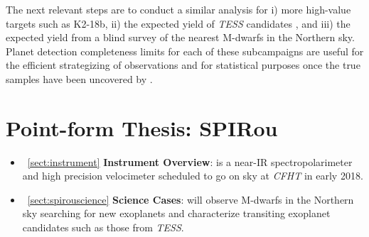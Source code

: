 The next relevant steps are to conduct a similar analysis for i) more 
high-value targets such as K2-18b, ii) the expected yield of \emph{TESS} 
candidates \citep{sullivan15}, and iii) the expected yield from a blind 
survey of the nearest M-dwarfs in the Northern sky. Planet detection 
completeness limits for each of these subcampaigns are useful for the 
efficient strategizing of observations and for statistical purposes once the 
true samples have been uncovered by \spirou{}.
\fi

\section{Point-form Thesis: SPIRou}
\begin{itemize}
\renewcommand\labelitemi{--}
\item~\ref{sect:instrument} \textbf{Instrument Overview}: \spirou{} is a near-IR 
spectropolarimeter and high precision velocimeter scheduled to go on sky at \emph{CFHT} 
in early 2018. 
\item~\ref{sect:spirouscience} \textbf{Science Cases}: \spirou{} will observe M-dwarfs 
in the Northern sky searching for new exoplanets and characterize transiting exoplanet 
candidates such as those from \emph{TESS}.
\end{itemize}
